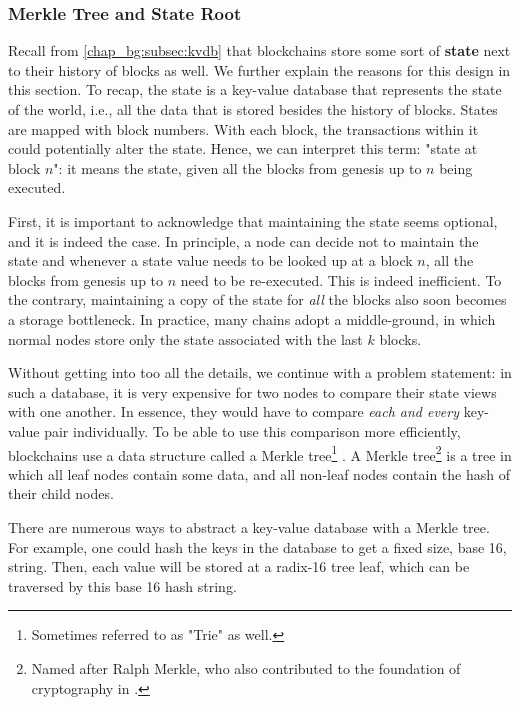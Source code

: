 \subsubsection{Merkle Tree and State Root} \label{chap_bg:subsec:trie}

Recall from \ref{chap_bg:subsec:kvdb} that blockchains store some sort of \textbf{state} next to
their history of blocks as well. We further explain the reasons for this design in this section. To
recap, the state is a key-value database that represents the state of the world, i.e., all the data
that is stored besides the history of blocks. States are mapped with block numbers. With each block,
the transactions within it could potentially alter the state. Hence, we can interpret this term:
"state at block $n$": it means the  state, given all the blocks from genesis up to $n$ being
executed.

First, it is important to acknowledge that maintaining the state seems optional, and it is indeed
the case. In principle, a node can decide not to maintain the state and whenever a state value needs
to be looked up at a block $n$, all the blocks from genesis up to $n$ need to be re-executed. This
is indeed inefficient. To the contrary, maintaining a copy of the state for \textit{all} the blocks
also soon becomes a storage bottleneck. In practice, many chains adopt a middle-ground, in which
normal nodes store only the state associated with the last $k$ blocks.

Without getting into too all the details, we continue with a problem statement: in such a database,
it is very expensive for two nodes to compare their state views with one another. In essence, they
would have to compare \textit{each and every} key-value pair individually. To be able to use this
comparison more efficiently, blockchains use a data structure called a Merkle
tree\footnote{Sometimes referred to as "Trie" as well.} \cite{merkleDigitalSignatureBased1988}. A
Merkle tree\footnote{Named after Ralph Merkle, who also contributed to the foundation of
cryptography in \cite{merkleSecureCommunicationsInsecure1978}.} is a tree in which all leaf nodes
contain some data, and all non-leaf nodes contain the hash of their child nodes.

There are numerous ways to abstract a key-value database with a Merkle tree. For example, one could
hash the keys in the database to get a fixed size, base 16, string. Then, each value will be stored
at a radix-16 tree leaf, which can be traversed by this base 16 hash string.

